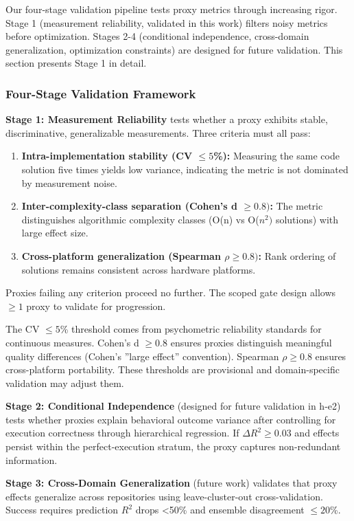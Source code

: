 
Our four-stage validation pipeline tests proxy metrics through increasing rigor. Stage 1 (measurement reliability, validated in this work) filters noisy metrics before optimization. Stages 2-4 (conditional independence, cross-domain generalization, optimization constraints) are designed for future validation. This section presents Stage 1 in detail.

\subsubsection{Four-Stage Validation Framework}

\textbf{Stage 1: Measurement Reliability} tests whether a proxy exhibits stable, discriminative, generalizable measurements. Three criteria must all pass:

\begin{enumerate}
\item \textbf{Intra-implementation stability (CV $\leq 5$\%):} Measuring the same code solution five times yields low variance, indicating the metric is not dominated by measurement noise.
\item \textbf{Inter-complexity-class separation (Cohen's d $\geq 0.8)$:} The metric distinguishes algorithmic complexity classes (O(n) vs O($n^{2})$ solutions) with large effect size.
\item \textbf{Cross-platform generalization (Spearman $\rho \geq 0.8)$:} Rank ordering of solutions remains consistent across hardware platforms.
\end{enumerate}

Proxies failing any criterion proceed no further. The scoped gate design allows $\geq 1$ proxy to validate for progression.

The CV $\leq 5$\% threshold comes from psychometric reliability standards for continuous measures. Cohen's d $\geq 0.8$ ensures proxies distinguish meaningful quality differences (Cohen's ''large effect'' convention). Spearman $\rho \geq 0.8$ ensures cross-platform portability. These thresholds are provisional and domain-specific validation may adjust them.

\textbf{Stage 2: Conditional Independence} (designed for future validation in h-e2) tests whether proxies explain behavioral outcome variance after controlling for execution correctness through hierarchical regression. If $\Delta R^2 \geq 0.03$ and effects persist within the perfect-execution stratum, the proxy captures non-redundant information.

\textbf{Stage 3: Cross-Domain Generalization} (future work) validates that proxy effects generalize across repositories using leave-cluster-out cross-validation. Success requires prediction $R^2$ drops <50\% and ensemble disagreement $\leq 20$\%.

